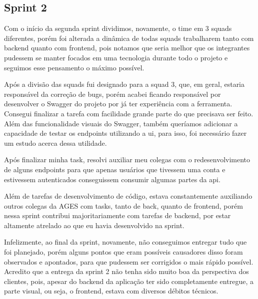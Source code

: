 \subsection{Sprint 2}

Com o início da segunda sprint dividimos, novamente, o time em 3 squads diferentes, porém foi alterada a dinâmica de todas squads trabalharem tanto com backend quanto com frontend, pois notamos que seria melhor que os integrantes pudessem se manter focados em uma tecnologia durante todo o projeto e seguimos esse pensamento o máximo possível.

Após a divisão das squads fui designado para a squad 3, que, em geral, estaria responsável da correção de bugs, porém acabei ficando responsável por desenvolver o Swagger\cite{swagger} do projeto por já ter experiência com a ferramenta. Consegui finalizar a tarefa com facilidade grande parte do que precisava ser feito. Além das funcionalidade visuais do Swagger\cite{swagger}, também queríamos adicionar a capacidade de testar os endpoints utilizando a \ac{ui}, para isso, foi necessário fazer um estudo acerca dessa utilidade.

Após finalizar minha task, resolvi auxiliar meu colegas com o redesenvolvimento de alguns endpoints para que apenas usuários que tivessem uma conta e estivessem autenticados conseguissem consumir algumas partes da \ac{api}.

Além de tarefas de desenvolvimento de código, estava constantemente auxiliando outros colegas da AGES com tasks, tanto de back, quanto de frontend, porém nessa sprint contribui majoritariamente com tarefas de backend, por estar altamente atrelado ao que eu havia desenvolvido na sprint.

Infelizmente, ao final da sprint, novamente, não conseguimos entregar tudo que foi planejado, porém alguns pontos que eram possíveis causadores disso foram observados e apontados, para que pudessem ser corrigidos o mais rápido possível. Acredito que a entrega da sprint 2 não tenha sido muito boa da perspectiva dos clientes, pois, apesar do backend da aplicação ter sido completamente entregue, a parte visual, ou seja, o frontend, estava com diversos débitos técnicos. 